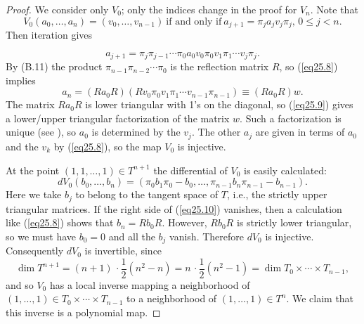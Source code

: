 \documentclass{surv-l}
\theoremstyle{plain}
\theoremstyle{definition}
\numberwithin{equation}{chapter}
\begin{document}
\begin{proof}
We consider only $V_{0}$; only the indices change in the proof for $V_{n}$. Note that
\begin{equation*}
V_{0} (a_{0}, \ldots,a_{n})=(v_{0}, \ldots, v_{n-1})\ \text{if and only if}\ a_{j+1}=\pi_{j}a_{j}v_{j}\pi_{j},\, 0\leq j<n.
\end{equation*}
Then iteration gives

\begin{equation}\label{eq25.8}
a_{j+1}=\pi_{j}\pi_{j-1}\cdots\pi_{0}a_{0}v_{0}\pi_{0}v_{1}\pi_{1}\cdots v_{j}\pi_{j}.
\end{equation}
By (B.11) the product $\pi_{n-1}\pi_{n-2}\cdots \pi_{0}$ is the reflection matrix $R$, so (\ref{eq25.8}) implies
\begin{equation}\label{eq25.9}
a_{n}=(Ra_{0}R)(Rv_{0}\pi_{0}v_{1}\pi_{1}\cdots v_{n-1}\pi_{n-1})\equiv(Ra_{0}R)w.
\end{equation}
The matrix $Ra_{0}R$ is lower triangular with 1's on the diagonal, so (\ref{eq25.9}) gives a lower/upper triangular factorization of the matrix $w$. Such a factorization is unique (see \cite{Str}), so $a_{0}$ is determined by the $v_{j}$. The other $a_{j}$ are given in terms of $a_{0}$ and the $v_{k}$ by (\ref{eq25.8}), so the map $V_{0}$ is injective.


At the point $(1, 1, \ldots, 1)\in T^{n+1}$ the differential of $V_{0}$ is easily calculated:
\begin{equation}\label{eq25.10}
dV_{0}(b_{0},\ldots, b_{n})=(\pi_{0}b_{1}\pi_{0}-b_{0},\ldots, \pi_{n-1}b_{n}\pi_{n-1}-b_{n-1}).
\end{equation}
Here we take $b_{j}$ to belong to the tangent space of $T$, i.e., the strictly upper triangular matrices. If the right side of (\ref{eq25.10}) vanishes, then a calculation like (\ref{eq25.8}) shows that $b_{n}=Rb_{0}R$. However, $Rb_{0}R$ is strictly lower triangular, so we must have $b_{0}=0$ and all the $b_{j}$ vanish. Therefore $dV_{0}$ is injective. Consequently $dV_{0}$ is invertible, since
\begin{equation*}
\dim T^{n+1}=(n+1)\,\cdot{\scriptstyle\frac{1}{2}}(n^{2}-n)=n\,\cdot  {\scriptstyle\frac{1}{2}}(n^{2}-1)=\dim T_{0}\times\cdots \times T_{n-1},
\end{equation*}
and so $V_{0}$ has a local inverse mapping a neighborhood of $(1,\ldots, 1)\in T_{0}\times\cdots\times T_{n-1}$ to a neighborhood of $(1,\ldots, 1) \in T^{n}$. We claim that this inverse is a polynomial map.


\end{proof}
\end{document}

